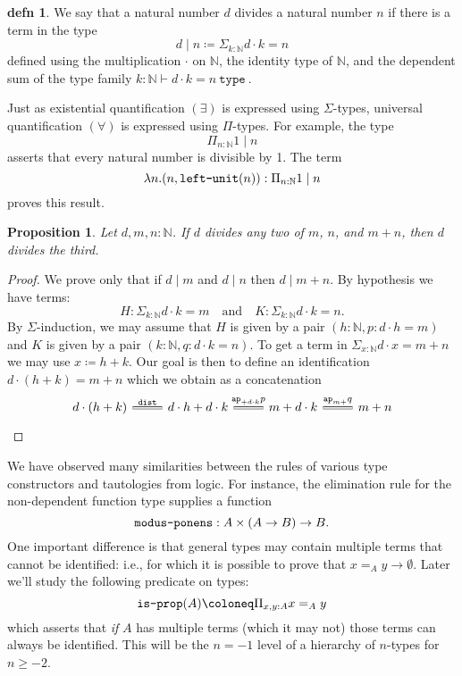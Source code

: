 \documentclass{amsart}
\theoremstyle{theorem}
\newtheorem*{prop}{Proposition}
\theoremstyle{definition}
\newtheorem*{defn}{defn}
\theoremstyle{remark}
\newcommand{\0}{\mathbbe{0}}
\newcommand{\1}{\mathbbe{1}}
\newcommand{\2}{\mathbbe{2}}
\newcommand{\3}{\mathbbe{3}}
\newcommand{\4}{\mathbbe{4}}
\newcommand{\univ}{{~\texttt{type}~}}
\newcommand{\term}[1]{{\textup{\texttt{#1}}}}
\newcommand{\bN}{{\mathbb{N}}}
\newcommand{\ap}{\term{ap}}
\begin{document}
\begin{defn} We say that a natural number $d$ divides a natural number $n$ if there is a term in the type
\[ d \mid n \coloneq \Sigma_{k : \bN} d \cdot k = n \]
defined using the multiplication $\cdot$ on $\bN$, the identity type of $\bN$, and the dependent sum of the type family $k : \bN \vdash d \cdot k = n \univ$.
\end{defn}

Just as existential quantification $(\exists)$ is expressed using $\Sigma$-types, universal quantification $(\forall)$ is expressed using $\Pi$-types. For example, the type
\[ \Pi_{n : \bN} 1 \mid n\]
asserts that every natural number is divisible by 1. The term
\[ \lambda n. (n, \term{left-unit}(n)) : \Pi_{n : \bN} 1 \mid n\]
proves this result.

\begin{prop} Let $d, m,n : \bN$. If $d$ divides any two of $m$, $n$, and $m+n$, then $d$ divides the third.
\end{prop}
\begin{proof}
We prove only that if $d \mid m$ and $d \mid n$ then $d \mid m+n$.
By hypothesis we have terms:
\[ H : \Sigma_{k : \bN} d \cdot k = m \quad \text{and} \quad K : \Sigma_{k : \bN} d \cdot k = n.\]
By $\Sigma$-induction, we may assume that $H$ is given by a pair $(h : \bN, p : d \cdot h = m)$ and $K$ is given by a pair $(k : \bN, q : d \cdot k = n)$. To get a term in $\Sigma_{x : \bN} d \cdot x = m + n$ we may use $x \coloneq h + k$. Our goal is then to define an identification $d \cdot (h + k) = m + n$ which we obtain as a concatenation
\[
\begin{tikzcd} d \cdot (h+ k ) \arrow[r, equals, "\term{dist}"] & d \cdot h + d \cdot k \arrow[r, equals, "\ap_{+d \cdot k}p"] & m + d \cdot k \arrow[r, equals, "\ap_{m+}q"] & m + n
\end{tikzcd}
\]
\end{proof}

We have observed many similarities between the rules of various type constructors and tautologies from logic. For instance, the elimination rule for the non-dependent function type supplies a function
\[ \term{modus-ponens} : A \times (A \to B) \to B.\]
One important difference is that general types may contain multiple terms that cannot be identified: i.e., for which it is possible to prove that $x =_A y \to \emptyset$. Later we'll study the following predicate on types:
\[ \term{is-prop}(A) \coloneq \Pi_{x,y : A} x =_A y\]
which asserts that \emph{if} $A$ has multiple terms (which it may not) those terms can always be identified. This will be the $n=-1$ level of a hierarchy of $n$-types for $n \geq -2$.
\end{document}
